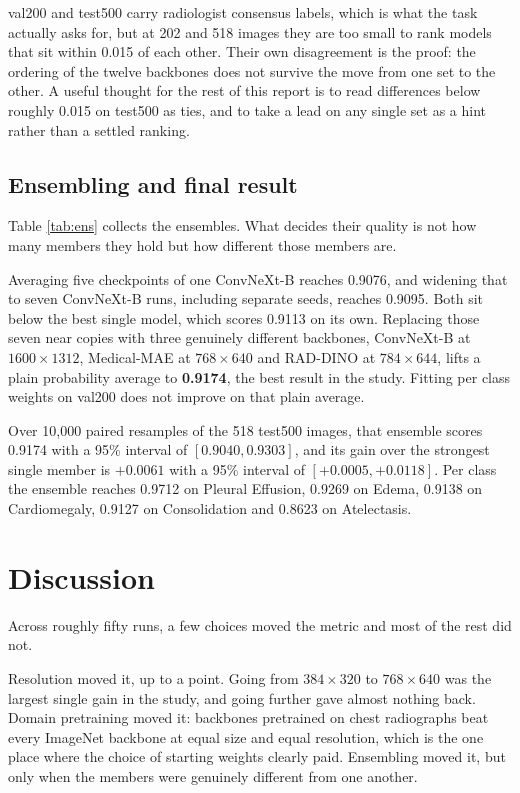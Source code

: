 \documentclass{article}
\begin{document}
val200 and test500 carry radiologist consensus labels, which is what the task actually
asks for, but at 202 and 518 images they are too small to rank models that sit within
0.015 of each other. Their own disagreement is the proof: the ordering of the twelve
backbones does not survive the move from one set to the other. A useful thought for the
rest of this report is to read differences below roughly 0.015 on test500 as ties, and
to take a lead on any single set as a hint rather than a settled ranking.



\subsection{Ensembling and final result}
\label{sec:results-ens}

Table \ref{tab:ens} collects the ensembles. What decides their quality is not how many
members they hold but how different those members are.

Averaging five checkpoints of one ConvNeXt-B reaches 0.9076, and widening that to seven
ConvNeXt-B runs, including separate seeds, reaches 0.9095. Both sit below the best single
model, which scores 0.9113 on its own. Replacing those seven near copies with three
genuinely different backbones, ConvNeXt-B at $1600\times1312$, Medical-MAE at
$768\times640$ and RAD-DINO at $784\times644$, lifts a plain probability average to
\textbf{0.9174}, the best result in the study. Fitting per class weights on val200 does
not improve on that plain average.

Over 10,000 paired resamples of the 518 test500 images, that ensemble scores 0.9174 with
a 95\% interval of $[0.9040, 0.9303]$, and its gain over the strongest single member is
$+0.0061$ with a 95\% interval of $[+0.0005, +0.0118]$. Per class the ensemble
reaches 0.9712 on Pleural Effusion, 0.9269 on Edema, 0.9138 on Cardiomegaly, 0.9127 on
Consolidation and 0.8623 on Atelectasis.



\section{Discussion}

Across roughly fifty runs, a few choices moved the metric and most of the rest did not.

Resolution moved it, up to a point. Going from $384\times320$ to $768\times640$ was the
largest single gain in the study, and going further gave almost nothing back. Domain
pretraining moved it: backbones pretrained on chest radiographs beat
every ImageNet backbone at equal size and equal resolution, which is the one place where
the choice of starting weights clearly paid. Ensembling moved it, but only when the
members were genuinely different from one another.
\end{document}
